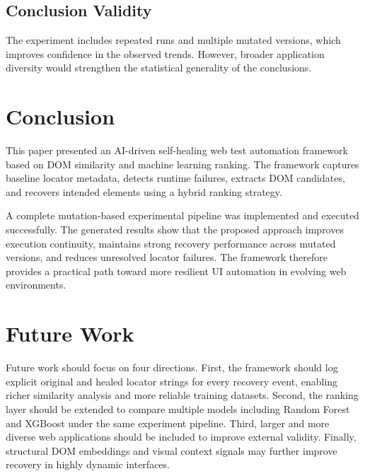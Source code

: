 \documentclass[conference]{IEEEtran}
\begin{document}
\subsection{Conclusion Validity}
The experiment includes repeated runs and multiple mutated versions, which improves confidence in the observed trends. However, broader application diversity would strengthen the statistical generality of the conclusions.

\section{Conclusion}
This paper presented an AI-driven self-healing web test automation framework based on DOM similarity and machine learning ranking. The framework captures baseline locator metadata, detects runtime failures, extracts DOM candidates, and recovers intended elements using a hybrid ranking strategy.

A complete mutation-based experimental pipeline was implemented and executed successfully. The generated results show that the proposed approach improves execution continuity, maintains strong recovery performance across mutated versions, and reduces unresolved locator failures. The framework therefore provides a practical path toward more resilient UI automation in evolving web environments.

\section{Future Work}
Future work should focus on four directions. First, the framework should log explicit original and healed locator strings for every recovery event, enabling richer similarity analysis and more reliable training datasets. Second, the ranking layer should be extended to compare multiple models including Random Forest and XGBoost under the same experiment pipeline. Third, larger and more diverse web applications should be included to improve external validity. Finally, structural DOM embeddings and visual context signals may further improve recovery in highly dynamic interfaces.
\end{document}

